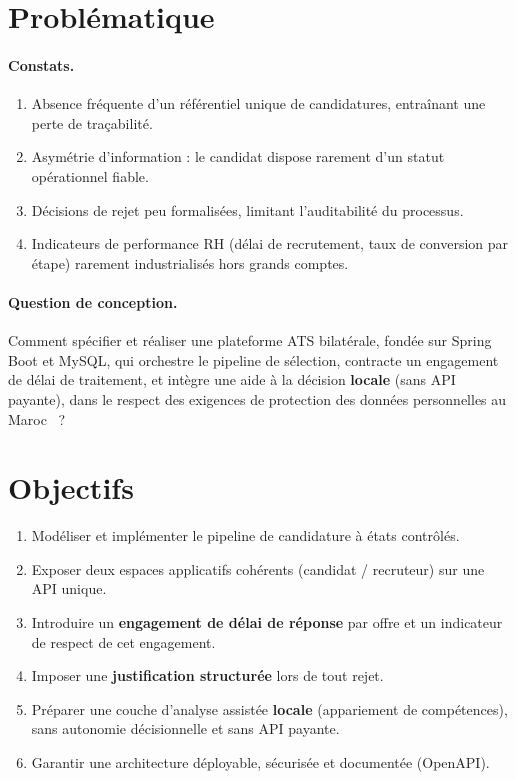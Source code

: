 \documentclass[12pt,a4paper,oneside]{report}
\begin{document}
\section{Problématique}

\paragraph{Constats.}
\begin{enumerate}[leftmargin=1.4em]
  \item Absence fréquente d'un référentiel unique de candidatures, entraînant une perte de traçabilité.
  \item Asymétrie d'information : le candidat dispose rarement d'un statut opérationnel fiable.
  \item Décisions de rejet peu formalisées, limitant l'auditabilité du processus.
  \item Indicateurs de performance RH (délai de recrutement, taux de conversion par étape) rarement industrialisés hors grands comptes.
\end{enumerate}

\paragraph{Question de conception.}
Comment spécifier et réaliser une plateforme ATS bilatérale, fondée sur Spring Boot et MySQL, qui orchestre le pipeline de sélection, contracte un engagement de délai de traitement, et intègre une aide à la décision \textbf{locale} (sans API payante), dans le respect des exigences de protection des données personnelles au Maroc~\cite{loi0908} ?

\section{Objectifs}

\begin{enumerate}[label=\textbf{O\arabic*.}]
  \item Modéliser et implémenter le pipeline de candidature à états contrôlés.
  \item Exposer deux espaces applicatifs cohérents (candidat / recruteur) sur une API unique.
  \item Introduire un \textbf{engagement de délai de réponse} par offre et un indicateur de respect de cet engagement.
  \item Imposer une \textbf{justification structurée} lors de tout rejet.
  \item Préparer une couche d'analyse assistée \textbf{locale} (appariement de compétences), sans autonomie décisionnelle et sans API payante.
  \item Garantir une architecture déployable, sécurisée et documentée (OpenAPI).
\end{enumerate}
\end{document}
